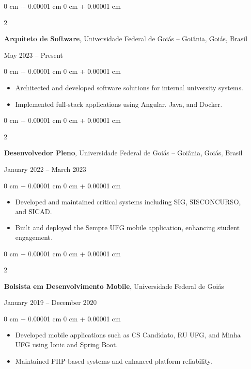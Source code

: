 \documentclass[10pt, letterpaper]{article}
\newenvironment{highlights}{
    \begin{itemize}[
        topsep=0.10 cm,
        parsep=0.10 cm,
        partopsep=0pt,
        itemsep=0pt,
        leftmargin=0 cm + 10pt
    ]
}{
    \end{itemize}
} %
\newenvironment{onecolentry}{
    \begin{adjustwidth}{
        0 cm + 0.00001 cm
    }{
        0 cm + 0.00001 cm
    }
}{
    \end{adjustwidth}
} %
\newenvironment{twocolentry}[2][]{
    \onecolentry
    \def\secondColumn{#2}
    \setcolumnwidth{\fill, 4.5 cm}
    \begin{paracol}{2}
}{
    \switchcolumn \raggedleft \secondColumn
    \end{paracol}
    \endonecolentry
} %
\begin{document}
        \begin{twocolentry}{
            May 2023 – Present
        }
            \textbf{Arquiteto de Software}, Universidade Federal de Goiás -- Goiânia, Goiás, Brasil
        \end{twocolentry}
        \vspace{0.10 cm}
        \begin{onecolentry}
            \begin{highlights}
                \item Architected and developed software solutions for internal university systems.
                \item Implemented full-stack applications using Angular, Java, and Docker.
            \end{highlights}
        \end{onecolentry}

        \vspace{0.2 cm}

        \begin{twocolentry}{
            January 2022 – March 2023
        }
            \textbf{Desenvolvedor Pleno}, Universidade Federal de Goiás -- Goiânia, Goiás, Brasil
        \end{twocolentry}
        \vspace{0.10 cm}
        \begin{onecolentry}
            \begin{highlights}
                \item Developed and maintained critical systems including SIG, SISCONCURSO, and SICAD.
                \item Built and deployed the Sempre UFG mobile application, enhancing student engagement.
            \end{highlights}
        \end{onecolentry}

        \vspace{0.2 cm}

        \begin{twocolentry}{
            January 2019 – December 2020
        }
            \textbf{Bolsista em Desenvolvimento Mobile}, Universidade Federal de Goiás
        \end{twocolentry}
        \vspace{0.10 cm}
        \begin{onecolentry}
            \begin{highlights}
                \item Developed mobile applications such as CS Candidato, RU UFG, and Minha UFG using Ionic and Spring Boot.
                \item Maintained PHP-based systems and enhanced platform reliability.
            \end{highlights}
        \end{onecolentry}
\end{document}
